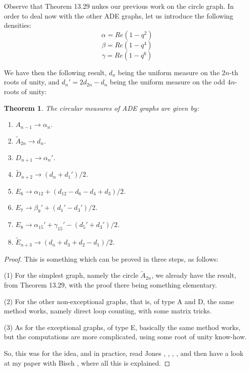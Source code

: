 \documentclass[12pt]{amsbook}
\newtheorem{theorem}{Theorem}[chapter]
\begin{document}
Observe that Theorem 13.29 nukes our previous work on the circle graph. In order to deal now with the other ADE graphs, let us introduce the following densities:
$$\alpha=Re(1-q^2)$$
$$\beta=Re(1-q^4)$$
$$\gamma=Re(1-q^6)$$

We have then the following result, $d_n$ being the uniform measure on the $2n$-th roots of unity, and $d_n'=2d_{2n}-d_n$ being the uniform measure on the odd $4n$-roots of unity:


\begin{theorem}
The circular measures of ADE graphs are given by:
\begin{enumerate}
\item $A_{n-1}\to\alpha_n$.

\item $\tilde{A}_{2n}\to d_n$.

\item $D_{n+1}\to\alpha_n'$.

\item $\tilde{D}_{n+2}\to (d_n+d_1')/2$.

\item $E_6\to\alpha_{12}+(d_{12}-d_6-d_4+d_3)/2$.

\item $E_7\to\beta_9'+(d_1'-d_3')/2$.

\item $E_8\to\alpha_{15}'+\gamma_{15}'-(d_5'+d_3')/2$.

\item $\tilde{E}_{n+3}\to (d_n+d_3+d_2-d_1)/2$.
\end{enumerate}
\end{theorem}

\begin{proof}
This is something which can be proved in three steps, as follows:

\medskip

(1) For the simplest graph, namely the circle $\tilde{A}_{2n}$, we already have the result, from Theorem 13.29, with the proof there being something elementary.

\medskip

(2) For the other non-exceptional graphs, that is, of type A and D, the same method works, namely direct loop counting, with some matrix tricks.

\medskip

(3) As for the exceptional graphs, of type E, basically the same method works, but the computations are more complicated, using some root of unity know-how. 

\medskip

So, this was for the idea, and in practice, read Jones \cite{jo1}, \cite{jo2}, \cite{jo3}, \cite{jo4}, and then have a look at my paper with Bisch \cite{bbi}, where all this is explained.
\end{proof}
\end{document}
